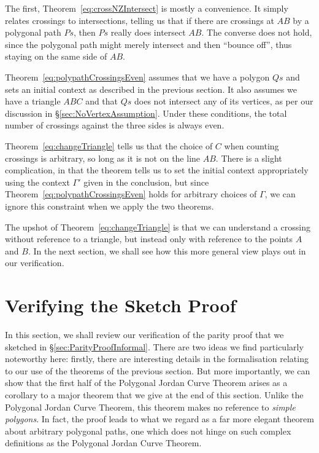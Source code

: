 The first, Theorem~\ref{eq:crossNZIntersect} is mostly a convenience. It simply relates crossings to intersections, telling us that if there are crossings at $AB$ by a polygonal path $Ps$, then $Ps$ really does intersect $AB$. The converse does not hold, since the polygonal path might merely intersect and then ``bounce off'', thus staying on the same side of $AB$.

Theorem~\ref{eq:polypathCrossingsEven} assumes that we have a polygon $Qs$ and sets an initial context as described in the previous section. It also assumes we have a triangle $ABC$ and that $Qs$ does not intersect any of its vertices, as per our discussion in \S\ref{sec:NoVertexAssumption}. Under these conditions, the total number of crossings against the three sides is always even.

Theorem~\ref{eq:changeTriangle} tells us that the choice of $C$ when counting crossings is arbitrary, so long as it is not on the line $AB$. There is a slight complication, in that the theorem tells us to set the initial context appropriately using the context $\Gamma'$ given in the conclusion, but since Theorem~\ref{eq:polypathCrossingsEven} holds for arbitrary choices of $\Gamma$, we can ignore this constraint when we apply the two theorems.

The upshot of Theorem~\ref{eq:changeTriangle} is that we can understand a crossing without reference to a triangle, but instead only with reference to the points $A$ and $B$. In the next section, we shall see how this more general view plays out in our verification.

\section{Verifying the Sketch Proof}
In this section, we shall review our verification of the parity proof that we sketched in \S\ref{sec:ParityProofInformal}. There are two ideas we find particularly noteworthy here: firstly, there are interesting details in the formalisation relating to our use of the theorems of the previous section. But more importantly, we can show that the first half of the Polygonal Jordan Curve Theorem arises as a corollary to a major theorem that we give at the end of this section. Unlike the Polygonal Jordan Curve Theorem, this theorem makes no reference to \emph{simple polygons}. In fact, the proof leads to what we regard as a far more elegant theorem about arbitrary polygonal paths, one which does not hinge on such complex definitions as the Polygonal Jordan Curve Theorem.

